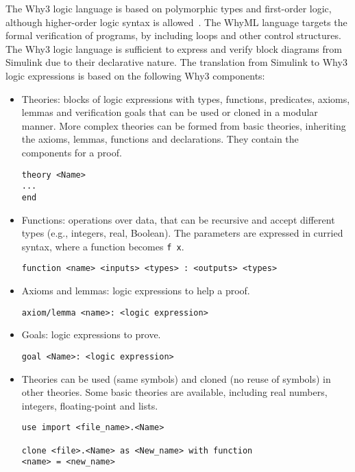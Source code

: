 \documentclass[a4paper]{article}
\begin{document}
The Why3 logic language is based on polymorphic types and first-order logic, although higher-order logic syntax is allowed~\cite{Why3b,Why3man}. The WhyML language targets the formal verification of programs, by including loops and other control structures. The Why3 logic language is sufficient to express and verify block diagrams from Simulink due to their declarative nature. The translation from Simulink to Why3 logic expressions is based on the following Why3 components: 
\begin{itemize}
\item Theories: blocks of logic expressions with types, functions, predicates, axioms, lemmas and verification goals that can be used or cloned in a modular manner. More complex theories can be formed from basic theories, inheriting the axioms, lemmas, functions and declarations. They contain the components for a proof. 

\begin{verbatim}
theory <Name>
...
end
\end{verbatim}

\item Functions: operations over data, that can be recursive and accept different types (e.g., integers, real, Boolean). The parameters are expressed in curried syntax, where a function  becomes \verb+f x+. 

\begin{verbatim}
function <name> <inputs> <types> : <outputs> <types>
\end{verbatim}

\item Axioms and lemmas: logic expressions to help a proof. 

\begin{verbatim}
axiom/lemma <name>: <logic expression>
\end{verbatim}

\item Goals: logic expressions to prove. 

\begin{verbatim}
goal <Name>: <logic expression>
\end{verbatim}

\item Theories can be used (same symbols) and cloned (no reuse of symbols) in other theories. Some basic theories are available, including real numbers, integers, floating-point and lists. 

\begin{verbatim}
use import <file_name>.<Name>

clone <file>.<Name> as <New_name> with function 
<name> = <new_name>
\end{verbatim}
\end{itemize}
\end{document}
